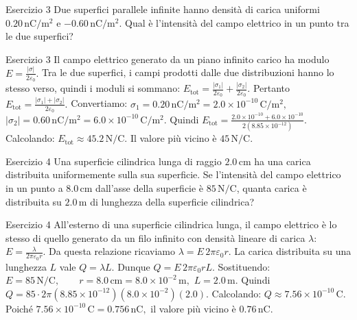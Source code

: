\documentclass[a4paper]{article}
\begin{document}
\begin{snippetexercise}{Esercizio 3}
    Due superfici parallele infinite hanno densità di carica uniformi
    \(0.20\,\mathrm{nC/m^2}\) e \(-0.60\,\mathrm{nC/m^2}\).
    Qual è l'intensità del campo elettrico in un punto tra le due superfici?

\end{snippetexercise}
\begin{snippetsolution}{Esercizio 3}
    Il campo elettrico generato da un piano infinito carico ha modulo
    \(E = \frac{|\sigma|}{2\varepsilon_0}.\)
    Tra le due superfici, i campi prodotti dalle due distribuzioni hanno lo
    stesso verso, quindi i moduli si sommano:
    \(E_{\mathrm{tot}} = \frac{|\sigma_1|}{2\varepsilon_0} + \frac{|\sigma_2|}{2\varepsilon_0}.\)
    Pertanto
    \(E_{\mathrm{tot}} = \frac{|\sigma_1| + |\sigma_2|}{2\varepsilon_0}.\)
    Convertiamo:
    \(\sigma_1 = 0.20\,\mathrm{nC/m^2} = 2.0 \times 10^{-10}\,\mathrm{C/m^2},\)
    \(|\sigma_2| = 0.60\,\mathrm{nC/m^2} = 6.0 \times 10^{-10}\,\mathrm{C/m^2}.\)
    Quindi
    \(E_{\mathrm{tot}} = \frac{ 2.0 \times 10^{-10} + 6.0 \times 10^{-10} }{ 2(8.85 \times 10^{-12}) }.\)
    Calcolando:
    \(E_{\mathrm{tot}} \approx 45.2\,\mathrm{N/C}.\)
    Il valore più vicino è
    \(\boxed{45\,\mathrm{N/C}}.\)
\end{snippetsolution}
\begin{snippetexercise}{Esercizio 4}
    Una superficie cilindrica lunga di raggio \(2.0\,\mathrm{cm}\) ha una
    carica distribuita uniformemente sulla sua superficie. Se l'intensità del
    campo elettrico in un punto a \(8.0\,\mathrm{cm}\) dall'asse della
    superficie è \(85\,\mathrm{N/C}\), quanta carica è distribuita su
    \(2.0\,\mathrm{m}\) di lunghezza della superficie cilindrica?

\end{snippetexercise}
\begin{snippetsolution}{Esercizio 4}
    All'esterno di una superficie cilindrica lunga, il campo elettrico è lo
    stesso di quello generato da un filo infinito con densità lineare di carica
    \(\lambda\):
    \(E = \frac{\lambda}{2\pi\varepsilon_0 r}.\)
    Da questa relazione ricaviamo
    \(\lambda = E\,2\pi\varepsilon_0 r.\)
    La carica distribuita su una lunghezza \(L\) vale
    \(Q = \lambda L.\)
    Dunque
    \(Q = E\,2\pi\varepsilon_0 rL.\)
    Sostituendo:
    \(E = 85\,\mathrm{N/C}, \qquad r = 8.0\,\mathrm{cm} = 8.0 \times 10^{-2}\,\mathrm{m},\)
    \(L = 2.0\,\mathrm{m}.\)
    Quindi
    \(Q = 85 \cdot 2\pi \left(8.85 \times 10^{-12}\right) \left(8.0 \times 10^{-2}\right) (2.0).\)
    Calcolando:
    \(Q \approx 7.56 \times 10^{-10}\,\mathrm{C}.\)
    Poiché
    \(7.56 \times 10^{-10}\,\mathrm{C} = 0.756\,\mathrm{nC},\)
    il valore più vicino è
    \(\boxed{0.76\,\mathrm{nC}}.\)
\end{snippetsolution}
\end{document}
